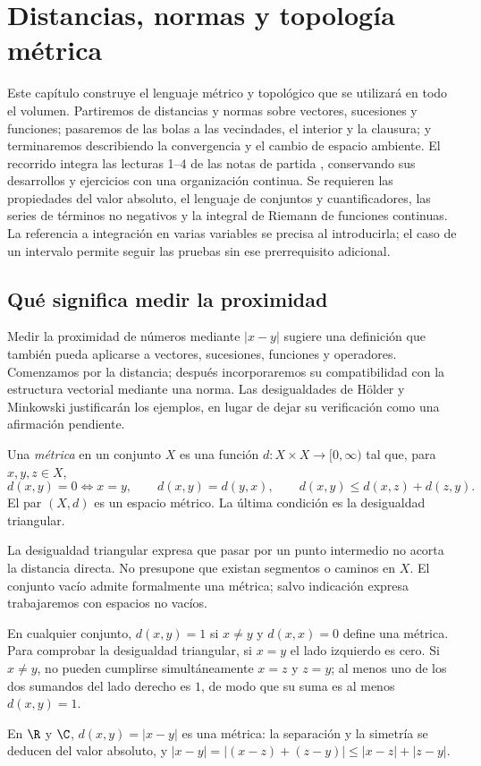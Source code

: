 \chapter{Distancias, normas y topología métrica}\label{cap:nuevo01}\label{chap:01}\label{chap:02}\label{chap:03}\label{chap:04}

Este capítulo construye el lenguaje métrico y topológico que se utilizará en todo el volumen. Partiremos de distancias y normas sobre vectores, sucesiones y funciones; pasaremos de las bolas a las vecindades, el interior y la clausura; y terminaremos describiendo la convergencia y el cambio de espacio ambiente. El recorrido integra las lecturas 1--4 de las notas de partida \cite{valencia}, conservando sus desarrollos y ejercicios con una organización continua. Se requieren las propiedades del valor absoluto, el lenguaje de conjuntos y cuantificadores, las series de términos no negativos y la integral de Riemann de funciones continuas. La referencia a integración en varias variables se precisa al introducirla; el caso de un intervalo permite seguir las pruebas sin ese prerrequisito adicional.

\section{Qué significa medir la proximidad}\label{lectura:01}
Medir la proximidad de números mediante $|x-y|$ sugiere una definición que también pueda aplicarse a vectores, sucesiones, funciones y operadores. Comenzamos por la distancia; después incorporaremos su compatibilidad con la estructura vectorial mediante una norma. Las desigualdades de Hölder y Minkowski justificarán los ejemplos, en lugar de dejar su verificación como una afirmación pendiente.

\begin{definicion}\label{ch01:metrica}
Una \emph{métrica} en un conjunto $X$ es una función $d:X\times X\to[0,\infty)$ tal que, para $x,y,z\in X$,
\[
d(x,y)=0\Longleftrightarrow x=y,\qquad d(x,y)=d(y,x),\qquad
d(x,y)\le d(x,z)+d(z,y).
\]
El par $(X,d)$ es un espacio métrico. La última condición es la desigualdad triangular.
\end{definicion}
La desigualdad triangular expresa que pasar por un punto intermedio no acorta la distancia directa. No presupone que existan segmentos o caminos en $X$. El conjunto vacío admite formalmente una métrica; salvo indicación expresa trabajaremos con espacios no vacíos.

\begin{ejemplo}
En cualquier conjunto, $d(x,y)=1$ si $x\ne y$ y $d(x,x)=0$ define una métrica. Para comprobar la desigualdad triangular, si $x=y$ el lado izquierdo es cero. Si $x\ne y$, no pueden cumplirse simultáneamente $x=z$ y $z=y$; al menos uno de los dos sumandos del lado derecho es $1$, de modo que su suma es al menos $d(x,y)=1$.
\end{ejemplo}
En $\R$ y $\C$, $d(x,y)=|x-y|$ es una métrica: la separación y la simetría se deducen del valor absoluto, y $|x-y|=|(x-z)+(z-y)|\le|x-z|+|z-y|$.

